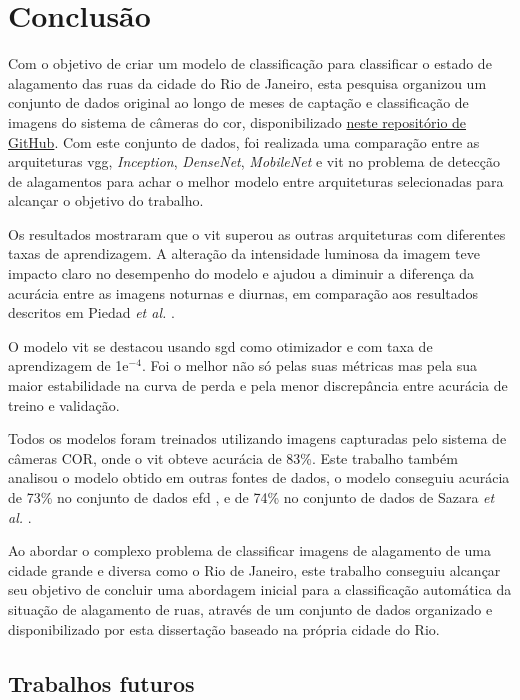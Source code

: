 \chapter{Conclusão}\label{cap:conclusoes}

Com o objetivo de criar um modelo de classificação para classificar o estado de alagamento das ruas da cidade do Rio de Janeiro,
esta pesquisa organizou um conjunto de dados original ao longo de meses de captação e classificação de imagens do sistema de câmeras do \acrshort{cor}, disponibilizado \href{https://github.com/afego/computervision}{neste repositório de GitHub}.
Com este conjunto de dados, foi realizada uma comparação entre as arquiteturas \acrshort{vgg}, \textit{Inception}, \textit{DenseNet}, \textit{MobileNet} e \Acrshort{vit} no problema de detecção de alagamentos
para achar o melhor modelo entre arquiteturas selecionadas para alcançar o objetivo do trabalho.

Os resultados mostraram que o \acrshort{vit} superou as outras arquiteturas com diferentes taxas de aprendizagem. 
A alteração da intensidade luminosa da imagem teve impacto claro no desempenho do modelo e ajudou a diminuir a diferença da acurácia entre as imagens noturnas e diurnas, 
em comparação aos resultados descritos em Piedad \textit{et al.} \cite{piedad2022}.

O modelo \acrshort{vit} se destacou usando \acrshort{sgd} como otimizador e com taxa de aprendizagem de 1e$^{-4}$. 
Foi o melhor não só pelas suas métricas mas pela sua maior estabilidade na curva de perda e pela menor discrepância entre acurácia de treino e validação.

Todos os modelos foram treinados utilizando imagens capturadas pelo sistema de câmeras COR, onde o \acrshort{vit} obteve acurácia de 83\%. 
Este trabalho também analisou o modelo obtido em outras fontes de dados, o modelo conseguiu acurácia de 73\% no conjunto de dados \acrshort{efd} \cite{BarzSchroeterMuench2018_1000117723}, 
e de 74\% no conjunto de dados de Sazara \textit{et al.} \cite{sazara2019}.

Ao abordar o complexo problema de classificar imagens de alagamento de uma cidade grande e diversa como o Rio de Janeiro, 
este trabalho conseguiu alcançar seu objetivo de concluir uma abordagem inicial para a classificação automática da situação de alagamento de ruas, 
através de um conjunto de dados organizado e disponibilizado por esta dissertação baseado na própria cidade do Rio.

\section{Trabalhos futuros}

